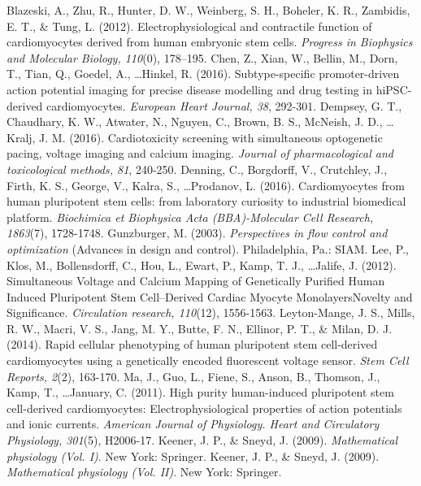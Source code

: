 \documentclass[12pt,a4paper]{article}
\begin{document}
\begin{thebibliography}{99}
 Blazeski, A., Zhu, R., Hunter, D. W., Weinberg, S. H., Boheler, K. R., Zambidis, E. T., \& Tung, L. (2012). Electrophysiological and contractile function of cardiomyocytes derived from human embryonic stem cells. \textit{Progress in Biophysics and Molecular Biology, 110}(0), 178–195.
 Chen, Z., Xian, W., Bellin, M., Dorn, T., Tian, Q., Goedel, A., \ldots Hinkel, R. (2016). Subtype-specific promoter-driven action potential imaging for precise disease modelling and drug testing in hiPSC-derived cardiomyocytes. \textit{European Heart Journal, 38}, 292-301.
 Dempsey, G. T., Chaudhary, K. W., Atwater, N., Nguyen, C., Brown, B. S., McNeish, J. D., \ldots Kralj, J. M. (2016). Cardiotoxicity screening with simultaneous optogenetic pacing, voltage imaging and calcium imaging. \textit{Journal of pharmacological and toxicological methods, 81}, 240-250.
 Denning, C., Borgdorff, V., Crutchley, J., Firth, K. S., George, V., Kalra, S., \ldots Prodanov, L. (2016). Cardiomyocytes from human pluripotent stem cells: from laboratory curiosity to industrial biomedical platform. \textit{Biochimica et Biophysica Acta (BBA)-Molecular Cell Research, 1863}(7), 1728-1748.
 Gunzburger, M. (2003). \textit{Perspectives in flow control and optimization} (Advances in design and control). Philadelphia, Pa.: SIAM.
 Lee, P., Klos, M., Bollensdorff, C., Hou, L., Ewart, P., Kamp, T. J., \ldots Jalife, J. (2012). Simultaneous Voltage and Calcium Mapping of Genetically Purified Human Induced Pluripotent Stem Cell–Derived Cardiac Myocyte MonolayersNovelty and Significance. \textit{Circulation research, 110}(12), 1556-1563.
 Leyton-Mange, J. S., Mills, R. W., Macri, V. S., Jang, M. Y., Butte, F. N., Ellinor, P. T., \& Milan, D. J. (2014). Rapid cellular phenotyping of human pluripotent stem cell-derived cardiomyocytes using a genetically encoded fluorescent voltage sensor. \textit{Stem Cell Reports, 2}(2), 163-170.
 Ma, J., Guo, L., Fiene, S., Anson, B., Thomson, J., Kamp, T., \ldots January, C. (2011). High purity human-induced pluripotent stem cell-derived cardiomyocytes: Electrophysiological properties of action potentials and ionic currents. \textit{American Journal of Physiology. Heart and Circulatory Physiology, 301}(5), H2006-17.
 Keener, J. P., \& Sneyd, J. (2009). \textit{Mathematical physiology (Vol. I)}. New York: Springer.
 Keener, J. P., \& Sneyd, J. (2009). \textit{Mathematical physiology (Vol. II)}. New York: Springer.

\end{thebibliography}
\end{document}

